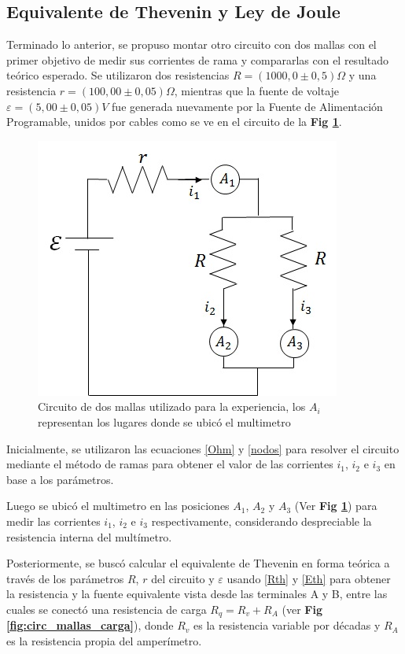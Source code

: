 \documentclass[11pt,a4paper]{article}
\begin{document}
\subsection{Equivalente de Thevenin y Ley de Joule}

Terminado lo anterior, se propuso montar otro circuito con dos mallas con el primer objetivo de medir sus corrientes de rama y compararlas con el resultado teórico esperado. Se utilizaron dos resistencias $R = (1000,0\pm0,5)\Omega$ y una resistencia $r = (100,00\pm0,05)\Omega$, mientras que la fuente de voltaje $\varepsilon = (5,00\pm0,05)V$ fue generada nuevamente por la Fuente de Alimentación Programable, unidos por cables como se ve en el circuito de la \textbf{Fig \ref{fig:circ_mallas}}.

\begin{figure}[h]
  \centering
  \includegraphics[scale=0.55]{Mallas_sin_carga}
  \caption{Circuito de dos mallas utilizado para la experiencia, los $A_i$ representan los lugares donde se ubicó el multimetro}
  \label{fig:circ_mallas}
\end{figure}

Inicialmente, se utilizaron las ecuaciones \eqref{Ohm} y \eqref{nodos} para resolver el circuito mediante el método de ramas para obtener el valor de las corrientes $i_1$, $i_2$ e $i_3$ en base a los parámetros. 
 
Luego se ubicó el multimetro en las posiciones $A_1$, $A_2$ y $A_3$ (Ver \textbf{Fig \ref{fig:circ_mallas}}) para medir las corrientes $i_1$, $i_2$ e $i_3$ respectivamente, considerando despreciable la resistencia interna del multímetro.
 
Posteriormente, se buscó calcular el equivalente de Thevenin en forma teórica a través de los parámetros $R$, $r$ del circuito y $\varepsilon$ usando \eqref{Rth} y \eqref{Eth} para obtener la resistencia y la fuente equivalente vista desde las terminales A y B, entre las cuales se conectó una resistencia de carga $R_q = R_v + R_A$ (ver \textbf{Fig \ref{fig:circ_mallas_carga}}), donde $R_v$ es la resistencia variable por décadas y $R_A$ es la resistencia propia del amperímetro. 
\end{document}
